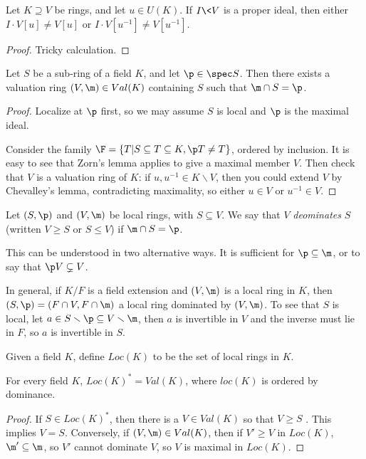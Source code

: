  \begin{lemma}[Chevalley]
   Let $K\supseteq V$ be rings, and let $u\in U(K)$. If $I\< V$ is a proper ideal, then
   either $I\cdot V[u]\neq V[u]$ or $I\cdot V[u^{-1}]\neq V[u^{-1}]$.
 \end{lemma}
 \begin{proof}
   Tricky calculation. \anton{}
 \end{proof}
 \begin{theorem}
   Let $S$ be a sub-ring of a field $K$, and let $\p\in\spec S$. Then there exists a
   valuation ring $(V,\m)\in Val(K)$ containing $S$ such that $\m\cap S=\p$.
 \end{theorem}
 \begin{proof}
   Localize at $\p$ first, so we may assume $S$ is local and $\p$ is the maximal ideal.

   Consider the family $\F=\{T| S\subseteq T\subseteq K, \p T\neq T\}$, ordered by
   inclusion. It is easy to see that Zorn's lemma applies to give a maximal member $V$.
   Then check that $V$ is a valuation ring of $K$: if $u,u^{-1}\in K\smallsetminus V$,
   then you could extend $V$ by Chevalley's lemma, contradicting maximality, so either
   $u\in V$ or $u^{-1}\in V$.
 \end{proof}
 \begin{definition}
   Let $(S,\p)$ and $(V,\m)$ be local rings, with $S\subseteq V$. We say that $V$
   \emph{deominates} $S$ (written $V\ge S$ or $S\le V$) if $\m\cap S=\p$.
 \end{definition}
 This can be understood in two alternative ways. It is sufficient for $\p\subseteq \m$,
 or to say that $\p V\subsetneq V$.

 In general, if $K/F$ is a field extension and $(V,\m)$ is a local ring in $K$, then
 $(S,\p)=(F\cap V,F\cap \m)$ a local ring dominated by $(V,\m)$. To see that $S$ is
 local, let $a\in S\smallsetminus \p\subseteq V\smallsetminus \m$, then $a$ is invertible
 in $V$ and the inverse must lie in $F$, so $a$ is invertible in $S$.

 Given a field $K$, define $Loc(K)$ to be the set of local rings in $K$.
 \begin{theorem}
   For every field $K$, $Loc(K)^*=Val(K)$, where $loc(K)$ is ordered by dominance.
 \end{theorem}
 \begin{proof}
   If $S\in Loc(K)^*$, then there is a $V\in Val(K)$ so that $V\ge S$ \anton{}. This
   implies $V=S$. Conversely, if $(V,\m)\in Val(K)$, then if $V'\ge V$ in $Loc(K)$,
   $\m'\subseteq \m$, so $V'$ cannot dominate $V$, so $V$ is maximal in $Loc(K)$.
 \end{proof}
 \setcounter{lecture}{36}


